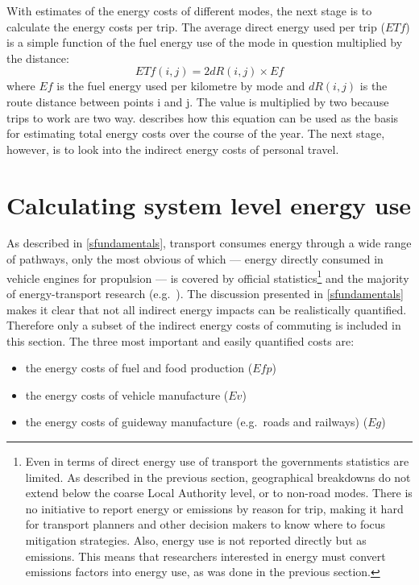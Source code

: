 \documentclass[a4paper, 11pt, twoside]{Thesis}
\begin{document}
With estimates of the energy costs of different modes, the next stage is to
calculate the energy costs per trip. The average
direct energy used per trip ($ETf$) is a simple function of the fuel
energy use of the mode in question multiplied by the distance:
\begin{equation}
 ETf(i,j) = 2 dR(i,j) \times Ef
\label{eq:et}
\end{equation}
where $Ef$ is the fuel energy used per kilometre by mode and $dR(i,j)$ is
the route distance between points i and j. The value is multiplied by two
because trips to work are two way.  
describes how this equation can be used as the basis for estimating total
energy costs over the course of the year. The next stage, however, is to
look into the indirect energy costs of personal travel.

\section{Calculating system level energy use} \label{ssystemlevel}
As described in \cref{sfundamentals}, transport consumes energy through a
wide range of pathways, only the most obvious of which ---
energy directly consumed in vehicle engines for propulsion --- is covered by official
statistics\footnote{Even
in terms of direct energy use of transport the governments statistics are limited.
As described in the previous section, geographical breakdowns do not extend
below the coarse Local Authority level, or to non-road modes. There is no
initiative to report energy or emissions by reason for trip, making it hard
for transport planners and other decision makers to know where to focus
mitigation strategies. Also, energy use is not reported directly but as emissions.
This means that
researchers interested in energy must convert
emissions factors into energy use, as was done in the previous section.
}
and the majority of energy-transport
research (e.g.~\citealp{schipper1992energy, Wohlgemuth1998, Hickman1999, Brand2013}).
The discussion presented in \cref{sfundamentals} makes it clear that not all
indirect energy impacts can be realistically quantified. Therefore only a subset of
the indirect energy costs of commuting is included in this section. The three most
important and easily quantified costs are:
\begin{itemize}
 \item the energy costs of fuel and food production ($Efp$)
 \item the energy costs of vehicle manufacture ($Ev$)
 \item the energy costs of guideway manufacture (e.g.~roads and railways) ($Eg$)
\end{itemize} 
\end{document}
